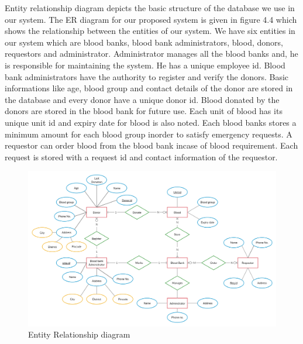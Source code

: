 Entity relationship diagram depicts the basic structure of the database we use in our system. The ER diagram for our proposed system is given in figure 4.4 which shows the relationship between the entities of our system. We have six entities in our system which are blood banks, blood bank administrators, blood, donors, requestors and administrator. Administrator manages all the blood banks and, he is responsible for maintaining the system. He has a unique employee id. Blood bank administrators have the authority to register and verify the donors. Basic informations like age, blood group and contact details of the donor are stored in the database and every donor have a unique donor id. Blood donated by the donors are stored in the blood bank for future use. Each unit of blood has its unique unit id and expiry date for blood is also noted. Each blood banks stores a minimum amount for each blood group inorder to satisfy emergency requests. A requestor can order blood from the blood bank incase of blood requirement. Each request is stored with a request id and contact information of the requestor.

\begin{figure}[bp!]
    \centering
    \includegraphics[width=\textwidth]{ER.jpg}
    \caption{Entity Relationship diagram}
\end{figure}

